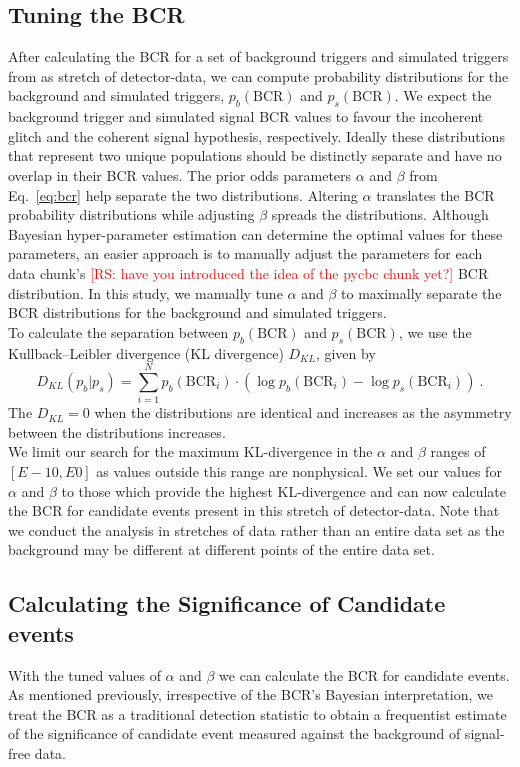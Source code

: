 \documentclass[%
preprint,
 amsmath,amssymb,
 aps,
]{revtex4}
\newcommand{\bcr}{{\sc BCR}\xspace}
\newcommand{\rs}[1]{\textcolor{red}{[RS: #1]}}
\begin{document}
\subsection{Tuning the BCR}

After calculating the \bcr for a set of background triggers and simulated triggers from as stretch of detector-data, we can compute probability distributions for the background and simulated triggers, $p_b(\text{BCR})$ and $p_s(\text{BCR})$. We expect the background trigger and simulated signal \bcr values to favour the incoherent glitch and the coherent signal hypothesis, respectively. Ideally these distributions that represent two unique populations should be distinctly separate and have no overlap in their \bcr values. The prior odds parameters $\alpha$ and $\beta$ from Eq.~\ref{eq:bcr} help separate the two distributions. Altering $\alpha$ translates the \bcr probability distributions while adjusting $\beta$ spreads the distributions. Although Bayesian hyper-parameter estimation can determine the optimal values for these parameters, an easier approach is to manually adjust the parameters for each data chunk's \rs{have you introduced the idea of the pycbc chunk yet?}  \bcr distribution. In this study, we manually tune $\alpha$ and $\beta$ to maximally separate the \bcr distributions for the background and simulated triggers. \\

To calculate the separation between $p_b(\text{BCR})$ and $p_s(\text{BCR})$, we use the Kullback--Leibler divergence (KL divergence) $D_{KL}$, given by
\begin{equation}
    D_{KL}(p_b | p_s) = \sum\limits_{i=1}^N p_b(\text{BCR}_i) \cdot (\log p_b(\text{BCR}_i) - \log p_s(\text{BCR}_i)) \ .
\end{equation}
The $D_{KL}=0$ when the distributions are identical and increases as the asymmetry between the distributions increases. \\

We limit our search for the maximum KL-divergence in the $\alpha$ and $\beta$ ranges of $[E-10, E0]$ as values outside this range are nonphysical. We set our values for $\alpha$ and $\beta$ to those which provide the highest KL-divergence and can now calculate the \bcr for candidate events present in this stretch of detector-data. Note that we conduct the analysis in stretches of data rather than an entire data set as the background may be different at different points of the entire data set.

\subsection{Calculating the Significance of Candidate events}
With the tuned values of $\alpha$ and $\beta$ we can calculate the \bcr for candidate events. As mentioned previously, irrespective of the \bcr's Bayesian interpretation, we treat the \bcr as a traditional detection statistic to obtain a frequentist estimate of the significance of candidate event measured against the background of signal-free data. \\
\end{document}
